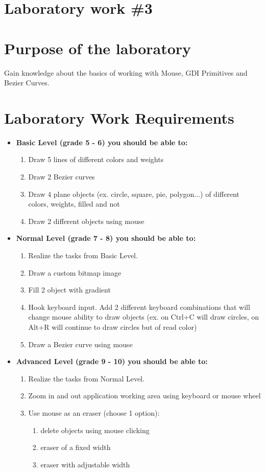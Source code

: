 \section*{Laboratory work \#3}

\section{Purpose of the laboratory}
Gain knowledge about the basics of working with Mouse, GDI Primitives and Bezier Curves.
\section{Laboratory Work Requirements}
\begin{itemize}
\item \textbf{Basic Level (grade 5 - 6) you should be able to:}
	\begin{enumerate}
	\item Draw 5 lines of different colors and weights
    \item Draw 2 Bezier curves
    \item Draw 4 plane objects (ex. circle, square, pie, polygon...) of different colors, weights, filled and not
    \item Draw 2 different objects using mouse

	\end{enumerate}
	
\item \textbf{Normal Level (grade 7 - 8) you should be able to:}
      \begin{enumerate}
    \item Realize the tasks from Basic Level.
    \item Draw a custom bitmap image
    \item Fill 2 object with gradient
    \item Hook keyboard input. Add 2 different keyboard combinations that will change mouse ability to draw objects (ex. on Ctrl+C will draw circles, on Alt+R will continue to draw circles but of read color)
    \item Draw a Bezier curve using mouse
 
    \end{enumerate}
          
\item \textbf{Advanced Level (grade 9 - 10) you should be able to:}
      \begin{enumerate} 
    \item Realize the tasks from Normal Level.
    \item Zoom in and out application working area using keyboard or mouse wheel
    \item Use mouse as an eraser (choose 1 option):
        \begin{enumerate}
        \item delete objects using mouse clicking
        \item eraser of a fixed width
        \item eraser with adjustable width
		\end{enumerate}
      \end{enumerate}
          

\end{itemize}
